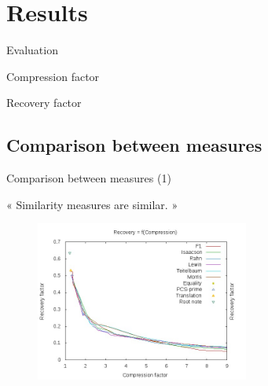 \documentclass[10pt]{beamer}
\begin{document}
\section{Results}

\begin{frame}{Evaluation}
\begin{block}{Compression factor}
\Large {}
\end{block}

\bigskip

\begin{block}{Recovery factor}
\Large {}
\end{block}
\end{frame}


\subsection{Comparison between measures}

\begin{frame}{Comparison between measures (1)}
\begin{block}{ }
\Large
« Similarity measures are similar. » \pause
\end{block}

\begin{figure}
\centering
\includegraphics[width = 7cm]{images/RfC77.jpg}
\end{figure}
\end{frame}
\end{document}
